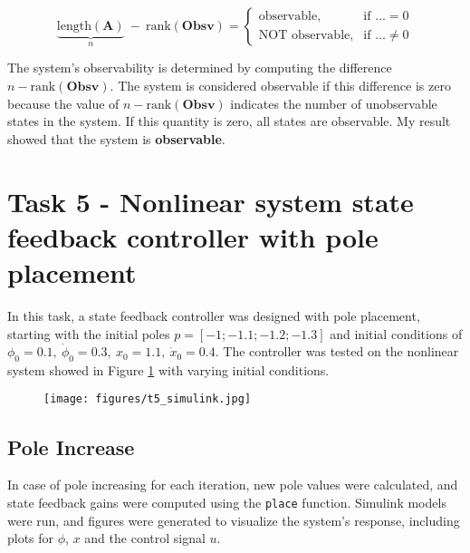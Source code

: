 \documentclass[12pt]{article}
\begin{document}
\begin{equation}
  \underbrace{\text{length}(\mathbf{A})}_{n}~ - ~ \text{rank}(\mathbf{Obsv})  = \begin{cases}
    \text{observable}, & \text{if } \dots = 0 \\
    \text{NOT observable}, & \text{if } \dots \neq 0
  \end{cases}
\end{equation}

\noindent The system's observability is determined by computing the difference \(n - \text{rank}(\mathbf{Obsv})\). The system is considered observable if this difference is zero because the value of \(n - \text{rank}(\mathbf{Obsv})\) indicates the number of unobservable states in the system. If this quantity is zero, all states are observable. My result showed that the system is \textbf{observable}.

\section*{Task 5 - Nonlinear system state feedback controller with pole placement}
In this task, a state feedback controller was designed with pole placement, starting with the initial poles $p = [-1; -1.1; -1.2; -1.3]$ and initial conditions of $\phi_0 = 0.1,~ \dot{\phi}_0 = 0.3, ~ x_0 = 1.1, ~ \dot{x}_0 = 0.4$. The controller was tested on the nonlinear system showed in Figure \ref{fig:task5_simulink} with varying initial conditions.

\begin{figure}[ht!]
  \begin{center}
  \texttt{[image: figures/t5\_simulink.jpg]}
  \label{fig:task5_simulink}
  \end{center}
\end{figure}

\subsection*{Pole Increase}
\noindent In case of pole increasing for each iteration, new pole values were calculated, and state feedback gains were computed using the \texttt{place} function. Simulink models were run, and figures were generated to visualize the system's response, including plots for $\phi$, $x$ and the control signal $u$. 
\end{document}
